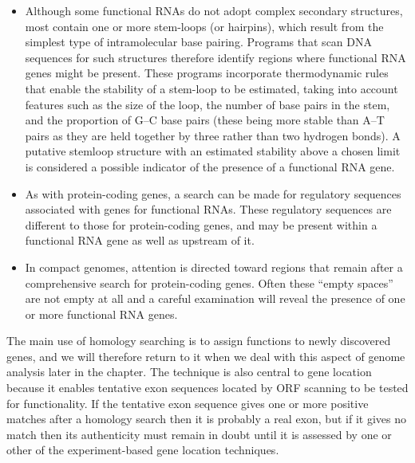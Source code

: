 \begin{itemize}
	\item Although some functional RNAs do not adopt complex secondary structures, most contain one or more stem-loops (or hairpins), which result
	from the simplest type of intramolecular base pairing. Programs that scan DNA sequences for such structures therefore identify regions where 
	functional RNA genes might be present. These programs incorporate thermodynamic rules that enable the stability of a stem-loop to be estimated, 
	taking into account features such as the size of the loop, the number of base pairs in the stem, and the proportion of G–C base pairs 
	(these being more stable than A–T pairs as they are held together by three rather than two hydrogen bonds). A putative stemloop structure 
	with an estimated stability above a chosen limit is considered a possible indicator of the presence of a functional RNA gene.

	\item As with protein-coding genes, a search can be made for regulatory sequences associated with genes for functional RNAs. These regulatory
	sequences are different to those for protein-coding genes, and may be present within a functional RNA gene as well as upstream of it.

	\item In compact genomes, attention is directed toward regions that remain after a comprehensive search for protein-coding genes. Often these
	“empty spaces” are not empty at all and a careful examination will reveal the presence of one or more functional RNA genes.
\end{itemize}

The main use of homology searching is to assign functions to newly discovered genes, and we will therefore return to it when we deal
with this aspect of genome analysis later in the chapter. The technique is also central to gene location because it enables tentative exon
sequences located by ORF scanning to be tested for functionality. If the tentative exon sequence gives one or more positive matches after a homology
search then it is probably a real exon, but if it gives no match then its authenticity must remain in doubt until it is assessed by one or other of 
the experiment-based gene location techniques.

